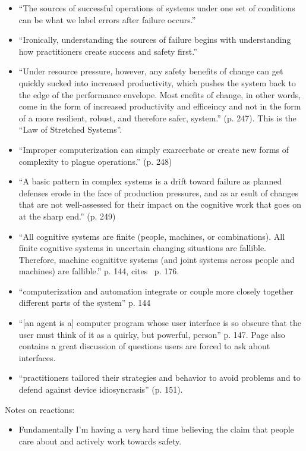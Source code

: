 \begin{itemize}

\item ``The sources of successful operations of systems under one set of conditions can be what we label errors after failure occurs.''
\item ``Ironically, understanding the sources of failure begins with understanding how practitioners create success and safety first.''
\item ``Under resource pressure, however, any safety benefits of change can get quickly sucked into increased productivity,
which pushes the system back to the edge of the performance envelope.
Most enefits of change, in other words, come in the form of increased productivity and efficeincy and not in the form of a more resilient, robust, and therefore safer, system.'' (p. 247). This is the ``Law of Stretched Systems''.
\item ``Improper computerization can simply exarcerbate or create new forms of complexity to plague operations.'' (p. 248)
\item ``A basic pattern in complex systems is a drift toward failure as planned defenses erode in the face of production pressures, and as ar esult of changes that are not well-assessed for their impact on the cognitive work that goes on at the sharp end.'' (p. 249)
\item ``All cognitive systems are finite (people, machines, or combinations).
All finite cognitive systems in uncertain changing situations are fallible.
Therefore, machine cognititve systems (and joint systems across people and machines) are fallible.'' p. 144, cites~\cite{0849339332} p. 176.
\item ``computerization and automation integrate or couple more closely together different parts of the system'' p. 144
\item ``[an agent is a] computer program whose user interface is so obscure that the user must think of it as a quirky, but powerful, person'' p. 147. Page also contains a great discussion of questions users are forced to ask about interfaces.
\item ``practitioners tailored their strategies and behavior to avoid problems and to defend against device idiosyncrasis'' (p. 151).
\end{itemize}

Notes on reactions:

\begin{itemize}
\item Fundamentally I'm having a \emph{very} hard time believing the claim that people care about and actively work towards safety.
\end{itemize}
